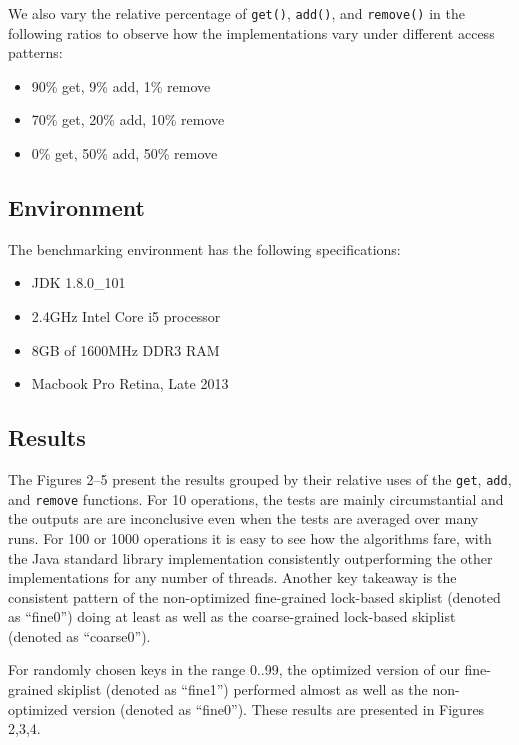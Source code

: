 \documentclass[12pt,oneline,a4paper]{ouparticle}
\begin{document}
We also vary the relative percentage of {\tt get()}, {\tt add()}, and {\tt remove()} in the following ratios to observe how the implementations vary under different access patterns:

\begin{itemize}
\itemsep0em 
    \item { 90\% get, 9\% add, 1\% remove}
    \item { 70\% get, 20\% add, 10\% remove}
    \item { 0\% get, 50\% add, 50\% remove}
\end{itemize}

\subsection{Environment}

The benchmarking environment has the following specifications:

\begin{itemize}
\itemsep0em 
    \item JDK 1.8.0\_101
    \item 2.4GHz Intel Core i5 processor
    \item 8GB of 1600MHz DDR3 RAM
    \item Macbook Pro Retina, Late 2013
\end{itemize}


\subsection{Results}

The Figures 2--5 present the results grouped by their relative uses of the {\tt get}, {\tt add}, and {\tt remove} functions. For 10 operations, the tests are mainly circumstantial and the outputs are are inconclusive even when the tests are averaged over many runs. For 100 or 1000 operations it is easy to see how the algorithms fare, with the Java standard library implementation consistently outperforming the other implementations for any number of threads. Another key takeaway is the consistent pattern of the non-optimized fine-grained lock-based skiplist (denoted as “fine0”) doing at least as well as the coarse-grained lock-based skiplist (denoted as “coarse0”).

For randomly chosen keys in the range 0..99, the optimized version of our fine-grained skiplist (denoted as “fine1”) performed almost as well as the non-optimized version (denoted as “fine0”). These results are presented in Figures 2,3,4.
\end{document}
